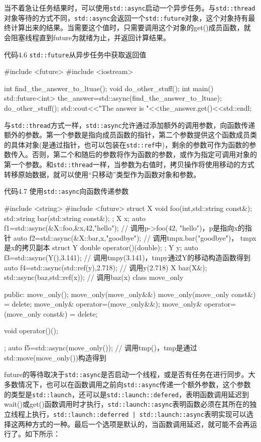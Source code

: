 当不着急让任务结果时，可以使用\texttt{std::async}启动一个异步任务。与\texttt{std::thread}对象等待的方式不同，\texttt{std::async}会返回一个\texttt{std::future}对象，这个对象持有最终计算出来的结果。当需要这个值时，只需要调用这个对象的get()成员函数，就会阻塞线程直到future为就绪为止，并返回计算结果。

代码4.6 \texttt{std::future}从异步任务中获取返回值

\begin{cpp}
#include <future>
#include <iostream>

int find_the_answer_to_ltuae();
void do_other_stuff();
int main()
{
  std::future<int> the_answer=std::async(find_the_answer_to_ltuae);
  do_other_stuff();
  std::cout<<"The answer is "<<the_answer.get()<<std::endl;
}
\end{cpp}

与\texttt{std::thread}方式一样，\texttt{std::async}允许通过添加额外的调用参数，向函数传递额外的参数。第一个参数是指向成员函数的指针，第二个参数提供这个函数成员类的具体对象(是通过指针，也可以包装在\texttt{std::ref}中)，剩余的参数可作为函数的参数传入。否则，第二个和随后的参数将作为函数的参数，或作为指定可调用对象的第一个参数。和\texttt{std::thread}一样，当参数为右值时，拷贝操作将使用移动的方式转移原始数据，就可以使用“只移动”类型作为函数对象和参数。

代码4.7 使用\texttt{std::async}向函数传递参数

\begin{cpp}
#include <string>
#include <future>
struct X
{
  void foo(int,std::string const&);
  std::string bar(std::string const&);
};
X x;
auto f1=std::async(&X::foo,&x,42,"hello");  // 调用p->foo(42, "hello")，p是指向x的指针
auto f2=std::async(&X::bar,x,"goodbye");  // 调用tmpx.bar("goodbye")， tmpx是x的拷贝副本
struct Y
{
  double operator()(double);
};
Y y;
auto f3=std::async(Y(),3.141);  // 调用tmpy(3.141)，tmpy通过Y的移动构造函数得到
auto f4=std::async(std::ref(y),2.718);  // 调用y(2.718)
X baz(X&);
std::async(baz,std::ref(x));  // 调用baz(x)
class move_only
{
public:
  move_only();
  move_only(move_only&&)
  move_only(move_only const&) = delete;
  move_only& operator=(move_only&&);
  move_only& operator=(move_only const&) = delete;

  void operator()();
};
auto f5=std::async(move_only());  // 调用tmp()，tmp是通过std::move(move_only())构造得到
\end{cpp}

future的等待取决于\texttt{std::async}是否启动一个线程，或是否有任务在进行同步。大多数情况下，也可以在函数调用之前向\texttt{std::async}传递一个额外参数，这个参数的类型是\texttt{std::launch}，还可以是\texttt{std::launch::defered}，表明函数调用延迟到wait()或get()函数调用时才执行，\texttt{std::launch::async}表明函数必须在其所在的独立线程上执行，\texttt{std::launch::deferred | std::launch::async}表明实现可以选择这两种方式的一种。最后一个选项是默认的，当函数调用延迟，就可能不会再运行了。如下所示：

